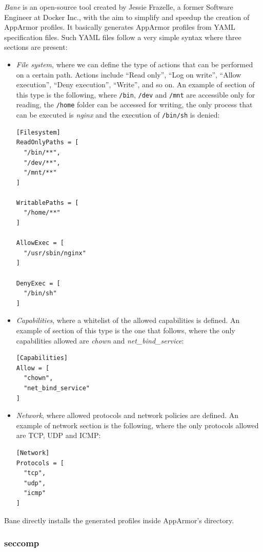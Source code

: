 \documentclass[a4paper,12pt]{article}
\newcommand{\file}[1]{\texttt{#1}\xspace}
\newcommand{\code}[1]{\lstinline|#1|}
\begin{document}
\textit{Bane} \cite{bane_jesse_frazelle} is an open-source tool created by
Jessie Frazelle, a former Software Engineer at Docker Inc., with the aim to
simplify and speedup the creation of AppArmor profiles. It basically generates
AppArmor profiles from YAML specification files. Such YAML files follow a very
simple syntax where three sections are present:
\begin{itemize}
  \item \textit{File system}, where we can define the type of actions that can
  be performed on a certain path. Actions include ``Read only'', ``Log on
  write'', ``Allow execution'', ``Deny execution'', ``Write'', and so on. An
  example of section of this type is the following, where \file{/bin},
  \file{/dev} and \file{/mnt} are accessible only for reading, the \file{/home}
  folder can be accessed for writing, the only process that can be executed is
  \textit{nginx} and the execution of \code{/bin/sh} is denied:
\begin{lstlisting}
[Filesystem]
ReadOnlyPaths = [
  "/bin/**",
  "/dev/**",
  "/mnt/**"
]

WritablePaths = [
  "/home/**"
]

AllowExec = [
  "/usr/sbin/nginx"
]

DenyExec = [
  "/bin/sh"
]   

\end{lstlisting}
  \item \textit{Capabilities}, where a whitelist of the allowed capabilities is
  defined. An example of section of this type is the one that follows, where the
  only capabilities allowed are \textit{chown} and \textit{net\_bind\_service}:
\begin{lstlisting}
[Capabilities]
Allow = [
  "chown",
  "net_bind_service"
]
\end{lstlisting}
  \item \textit{Network}, where allowed protocols and network policies are
  defined. An example of network section is the following, where the only
  protocols allowed are TCP, UDP and ICMP:
\begin{lstlisting}
[Network]
Protocols = [
  "tcp",
  "udp",
  "icmp"
]
\end{lstlisting}
\end{itemize}
Bane directly installs the generated profiles inside AppArmor's directory.  

\subsubsection{seccomp}
\end{document}
